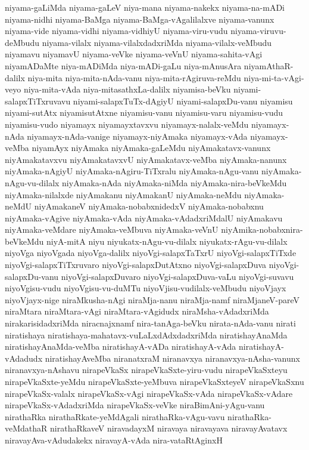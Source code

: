 {niyama-gaLiMda
niyama-gaLeV
niya-mana
niyama-nakekx
niyama-na-mADi
niyama-nidhi
niyama-BaMga
niyama-BaMga-vAgalilalxve
niyama-vanunx
niyama-vide
niyama-vidhi
niyama-vidhiyU
niyama-viru-vudu
niyama-viruvu-deMbudu
niyama-vilalx
niyama-vilalxdadxriMda
niyama-vilalx-veMbudu
niyamavu
niyamavU
niyama-veVke
niyama-veVnU
niyama-sahita-vAgi
niyamADaMte
niya-mADiMda
niya-mADi-gaLu
niya-mAnusAra
niyamAthaR-dalilx
niya-mita
niya-mita-nAda-vanu
niya-mita-rAgiruva-reMdu
niya-mi-ta-vAgi-veyo
niya-mita-vAda
niya-mitasathxLa-dalilx
niyamisa-beVku
niyami-salapxTiTxruvavu
niyami-salapxTuTx-dAgiyU
niyami-salapxDu-vanu
niyamisu
niyami-sutAtx
niyamisutAtxne
niyamisu-vanu
niyamisu-varu
niyamisu-vudu
niyamisu-vudo
niyamayx
niyamayxtavxvu
niyamayx-nalalx-veMdu
niyamayx-nAda
niyamayx-nAda-vanige
niyamayx-niyAmaka
niyamayx-vAda
niyamayx-veMba
niyamAyx
niyAmaka
niyAmaka-gaLeMdu
niyAmakatavx-vanunx
niyAmakatavxvu
niyAmakatavxvU
niyAmakatavx-veMba
niyAmaka-nanunx
niyAmaka-nAgiyU
niyAmaka-nAgiru-TiTxralu
niyAmaka-nAgu-vanu
niyAmaka-nAgu-vu-dilalx
niyAmaka-nAda
niyAmaka-niMda
niyAmaka-nira-beVkeMdu
niyAmaka-nilalxde
niyAmakanu
niyAmakanU
niyAmaka-neMdu
niyAmaka-neMdU
niyAmakaneV
niyAmaka-nobabxnidedxV
niyAmaka-nobabxnu
niyAmaka-vAgive
niyAmaka-vAda
niyAmaka-vAdadxriMdalU
niyAmakavu
niyAmaka-veMdare
niyAmaka-veMbuva
niyAmaka-veVnU
niyAmika-nobabxnira-beVkeMdu
niyA-mitA
niyu
niyukatx-nAgu-vu-dilalx
niyukatx-rAgu-vu-dilalx
niyoVga
niyoVgada
niyoVga-dalilx
niyoVgi-salapxTaTxrU
niyoVgi-salapxTiTxde
niyoVgi-salapxTiTxruvaro
niyoVgi-salapxDutAtxno
niyoVgi-salapxDuva
niyoVgi-salapxDu-vanu
niyoVgi-salapxDuvaro
niyoVgi-salapxDuva-vaLu
niyoVgi-suvavu
niyoVgisu-vudu
niyoVgisu-vu-duMTu
niyoVjisu-vudilalx-veMbudu
niyoVjayx
niyoVjayx-nige
niraMkusha-nAgi
niraMja-nanu
niraMja-namf
niraMjaneV-pareV
niraMtara
niraMtara-vAgi
niraMtara-vAgidudx
niraMsha-vAdadxriMda
nirakarisidadxriMda
niracnajxnamf
nira-tanAga-beVku
nirata-nAda-vanu
nirati
niratishaya
niratishaya-mahatavx-vuLaLxdAdxdadxriMda
niratishayAnaMda
niratishayAnaMda-veMba
niratishayA-vADa
niratishayA-vAda
niratishayA-vAdadudx
niratishayAveMba
niranatxraM
niranavxya
niranavxya-nAsha-vanunx
niranavxya-nAshavu
nirapeVkaSx
nirapeVkaSxte-yiru-vudu
nirapeVkaSxteyu
nirapeVkaSxte-yeMdu
nirapeVkaSxte-yeMbuva
nirapeVkaSxteyeV
nirapeVkaSxnu
nirapeVkaSx-valalx
nirapeVkaSx-vAgi
nirapeVkaSx-vAda
nirapeVkaSx-vAdare
nirapeVkaSx-vAdadxriMda
nirapeVkaSx-veVke
niraBimAni-yAgu-vanu
nirathaRka
nirathaRkate-yeMdAgali
nirathaRka-vAgu-vavu
nirathaRka-veMdathaR
nirathaRkaveV
niravadayxM
niravaya
niravayava
niravayAvatavx
niravayAva-vAdudakekx
niravayA-vAda
nira-vataRtAginxH
}
